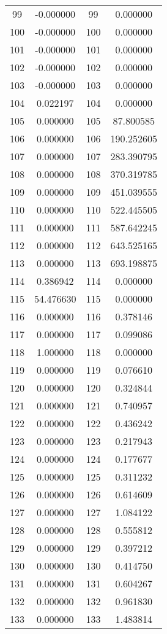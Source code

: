 \documentclass[12pt]{article}
\begin{document}
\begin{longtable}{@{}cccc@{}}
99 & -0.000000 & 99 & 0.000000 \\
100 & -0.000000 & 100 & 0.000000 \\
101 & -0.000000 & 101 & 0.000000 \\
102 & -0.000000 & 102 & 0.000000 \\
103 & -0.000000 & 103 & 0.000000 \\
104 & 0.022197 & 104 & 0.000000 \\
105 & 0.000000 & 105 & 87.800585 \\
106 & 0.000000 & 106 & 190.252605 \\
107 & 0.000000 & 107 & 283.390795 \\
108 & 0.000000 & 108 & 370.319785 \\
109 & 0.000000 & 109 & 451.039555 \\
110 & 0.000000 & 110 & 522.445505 \\
111 & 0.000000 & 111 & 587.642245 \\
112 & 0.000000 & 112 & 643.525165 \\
113 & 0.000000 & 113 & 693.198875 \\
114 & 0.386942 & 114 & 0.000000 \\
115 & 54.476630 & 115 & 0.000000 \\
116 & 0.000000 & 116 & 0.378146 \\
117 & 0.000000 & 117 & 0.099086 \\
118 & 1.000000 & 118 & 0.000000 \\
119 & 0.000000 & 119 & 0.076610 \\
120 & 0.000000 & 120 & 0.324844 \\
121 & 0.000000 & 121 & 0.740957 \\
122 & 0.000000 & 122 & 0.436242 \\
123 & 0.000000 & 123 & 0.217943 \\
124 & 0.000000 & 124 & 0.177677 \\
125 & 0.000000 & 125 & 0.311232 \\
126 & 0.000000 & 126 & 0.614609 \\
127 & 0.000000 & 127 & 1.084122 \\
128 & 0.000000 & 128 & 0.555812 \\
129 & 0.000000 & 129 & 0.397212 \\
130 & 0.000000 & 130 & 0.414750 \\
131 & 0.000000 & 131 & 0.604267 \\
132 & 0.000000 & 132 & 0.961830 \\
133 & 0.000000 & 133 & 1.483814 \\

\end{longtable}
\end{document}
